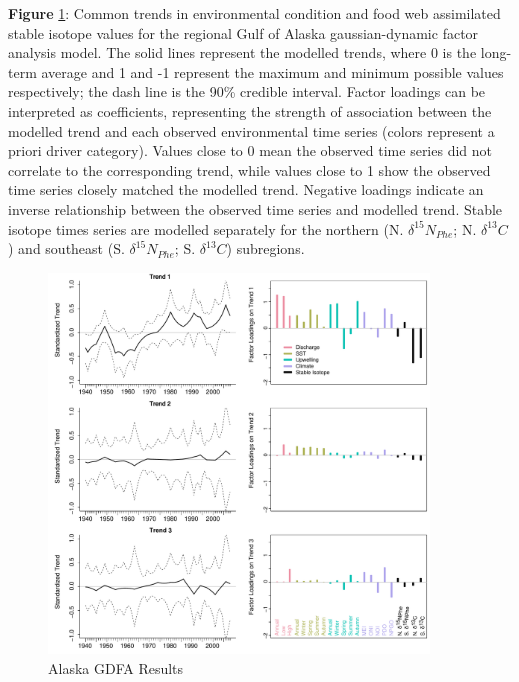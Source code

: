 \documentclass [11pt, proquest] {uwthesis}[2015/03/03]
\begin{document}
\textbf{Figure} \ref{fig:GDFAAK}: Common trends in environmental
condition and food web assimilated stable isotope values for the
regional Gulf of Alaska gaussian-dynamic factor analysis model. The
solid lines represent the modelled trends, where 0 is the long-term
average and 1 and -1 represent the maximum and minimum possible values
respectively; the dash line is the 90\% credible interval. Factor
loadings can be interpreted as coefficients, representing the strength
of association between the modelled trend and each observed
environmental time series (colors represent a priori driver category).
Values close to 0 mean the observed time series did not correlate to the
corresponding trend, while values close to 1 show the observed time
series closely matched the modelled trend. Negative loadings indicate an
inverse relationship between the observed time series and modelled
trend. Stable isotope times series are modelled separately for the
northern (N. \(\delta^{15}N_{Phe}\); N. \(\delta^{13}C\)) and southeast
(S. \(\delta^{15}N_{Phe}\); S. \(\delta^{13}C\)) subregions.\\
\newline 
\begin{figure}[h]
\centering
  \includegraphics[width=0.9\textwidth]{figure/Ch2/Figure6_AK.GDFA.pdf}
  \caption{Alaska GDFA Results}
  \label{fig:GDFAAK}
\end{figure}
\clearpage
\end{document}
